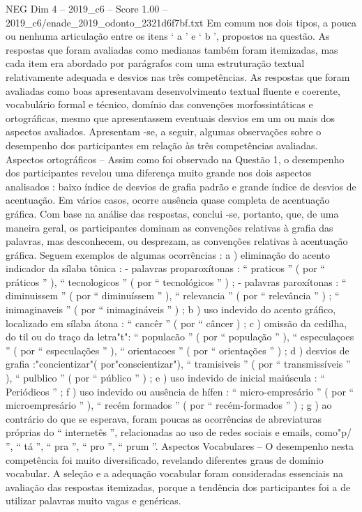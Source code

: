 \begin{textsample}{NEG Dim 4 – 2019\_c6 – Score 1.00 – 2019\_c6/enade\_2019\_odonto\_2321d6f7bf.txt}
Em comum nos dois tipos, a pouca ou nenhuma articulação entre os itens ‘ a ’ e ‘ b ’, propostos na questão.
As respostas que foram avaliadas como medianas também foram itemizadas, mas cada item era abordado por parágrafos com uma estruturação textual relativamente adequada e desvios nas três competências.
As respostas que foram avaliadas como boas apresentavam desenvolvimento textual fluente e coerente, vocabulário formal e técnico, domínio das convenções morfossintáticas e ortográficas, mesmo que apresentassem eventuais desvios em um ou mais dos aspectos avaliados.
Apresentam -se, a seguir, algumas observações sobre o desempenho dos participantes em relação às três competências avaliadas.
Aspectos ortográficos – Assim como foi observado na Questão 1, o desempenho dos participantes revelou uma diferença muito grande nos dois aspectos analisados : baixo índice de desvios de grafia padrão e grande índice de desvios de acentuação.
Em vários casos, ocorre ausência quase completa de acentuação gráfica.
Com base na análise das respostas, conclui -se, portanto, que, de uma maneira geral, os participantes dominam as convenções relativas à grafia das palavras, mas desconhecem, ou desprezam, as convenções relativas à acentuação gráfica.
Seguem exemplos de algumas ocorrências : a ) eliminação do acento indicador da sílaba tônica : - palavras proparoxítonas : “ praticos ” ( por “ práticos ” ), “ tecnologicos ” ( por “ tecnológicos ” ) ; - palavras paroxítonas : “ diminuissem ” ( por “ diminuíssem ” ), “ relevancia ” ( por “ relevância ” ) ; “ inimaginaveis ” ( por “ inimagináveis ” ) ; b ) uso indevido do acento gráfico, localizado em sílaba átona : “ cancêr ” ( por “ câncer ) ; c ) omissão da cedilha, do til ou do traço da letra"t": “ populacão ” ( por “ população ” ), “ especulaçoes ” ( por “ especulações ” ), “ orientacoes ” ( por “ orientações ” ) ; d ) desvios de grafia :"concientizar"( por"conscientizar"), “ tramisiveis ” ( por “ transmissíveis ” ), “ pulblico ” ( por “ público ” ) ; e ) uso indevido de inicial maiúscula : “ Periódicos ” ; f ) uso indevido ou ausência de hífen : “ micro-empresário ” ( por “ microempresário ” ), “ recém formados ” ( por “ recém-formados ” ) ; g ) ao contrário do que se esperava, foram poucas as ocorrências de abreviaturas próprias do “ internetês ”, relacionadas ao uso de redes sociais e emails, como"p/ ”, “ tá ”, “ pra ”, “ pro ”, “ prum ”.
Aspectos Vocabulares – O desempenho nesta competência foi muito diversificado, revelando diferentes graus de domínio vocabular.
A seleção e a adequação vocabular foram consideradas essenciais na avaliação das respostas itemizadas, porque a tendência dos participantes foi a de utilizar palavras muito vagas e genéricas.

\end{textsample}
